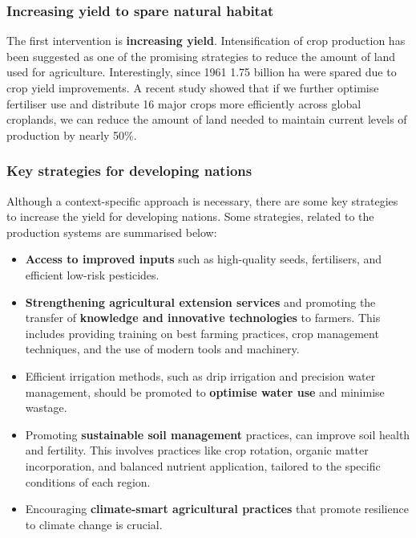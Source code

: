 \documentclass[../summary.tex]{subfiles}
\begin{document}
\subsubsection{Increasing yield to spare natural habitat}

The first intervention is \textbf{increasing yield}. Intensification of crop production has been suggested as one of the promising strategies to reduce the amount of land used for agriculture. Interestingly, since 1961 1.75 billion \unit{\hectare} were spared due to crop yield improvements. A recent study showed that if we further optimise fertiliser use and distribute 16 major crops more efficiently across global croplands, we can reduce the amount of land needed to maintain current levels of production by nearly 50\%.

\subsubsection{Key strategies for developing nations}

Although a context-specific approach is necessary, there are some key strategies to increase the yield for developing nations. Some strategies, related to the production systems are summarised below:

\begin{itemize}
	\item \textbf{Access to improved inputs} such as high-quality seeds, fertilisers, and efficient low-risk pesticides.
	\item \textbf{Strengthening agricultural extension services }and promoting the transfer of \textbf{knowledge and innovative technologies} to farmers. This includes providing training on best farming practices, crop management techniques, and the use of modern tools and machinery.
	\item Efficient irrigation methods, such as drip irrigation and precision water management, should be promoted to \textbf{optimise water use} and minimise wastage.
	\item Promoting \textbf{sustainable soil management} practices, can improve soil health and fertility. This involves practices like crop rotation, organic matter incorporation, and balanced nutrient application, tailored to the specific conditions of each region.
	\item Encouraging \textbf{climate-smart agricultural practices} that promote resilience to climate change is crucial.
\end{itemize} %
\end{document}
